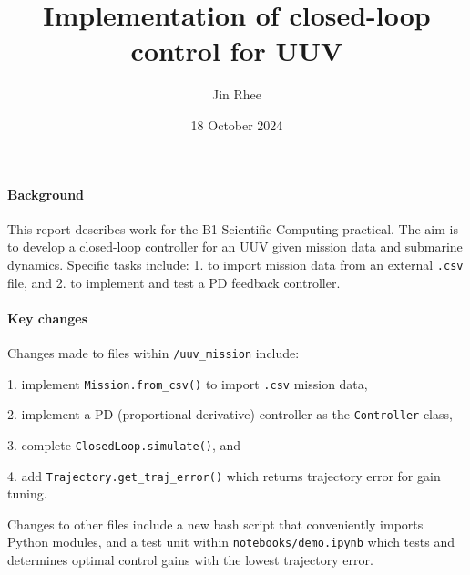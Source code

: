 \documentclass[11pt]{article}
\title{Implementation of closed-loop control for UUV}
\author{Jin Rhee}
\date{18 October 2024}
\begin{document}
\maketitle
\thispagestyle{empty}
\paragraph{Background} This report describes work for the B1 Scientific Computing practical. The aim is to develop a closed-loop controller for an UUV given mission data and submarine dynamics.
Specific tasks include: 1. to import mission data from an external \texttt{.csv} file, and
2. to implement and test a PD feedback controller.

\paragraph{Key changes}
Changes made to files within \texttt{/uuv\_mission} include:
\par 1. implement \texttt{Mission.from\_csv()} to import \texttt{.csv} mission data,
\par 2. implement a PD (proportional-derivative) controller as the \texttt{Controller} class,
\par 3. complete \texttt{ClosedLoop.simulate()}, and
\par 4. add \texttt{Trajectory.get\_traj\_error()} which returns trajectory error for gain tuning.
\par
Changes to other files include a new bash script that conveniently imports Python modules, and a
test unit within \texttt{notebooks/demo.ipynb} which tests and determines optimal control gains with the
lowest trajectory error.


\end{document}
